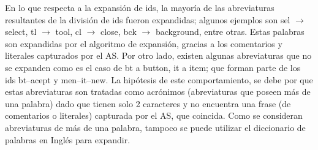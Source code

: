 En lo que respecta a la expansión de ids, la mayoría de las abreviaturas resultantes de la división de ids fueron expandidas; algunos ejemplos son \textsf{sel} $\rightarrow$ \textsf{select}, \textsf{tl} $\rightarrow$ \textsf{tool}, \textsf{cl} $\rightarrow$ \textsf{close}, \textsf{bck} $\rightarrow$ \textsf{background}, entre otras. Estas palabras son expandidas por el algoritmo de expansión, gracias a los comentarios y literales capturados por el AS.
Por otro lado, existen algunas abreviaturas que no se expanden como es el caso de \textsf{bt} a \textsf{button}, \textsf{it} a \textsf{item}; que forman parte de los ids \textsf{bt--acept} y \textsf{men--it--new}. La hipótesis de este comportamiento, se debe por que estas abreviaturas son tratadas como acrónimos (abreviaturas que poseen más de una palabra) dado que tienen solo 2 caracteres y no encuentra una frase (de comentarios o literales) capturada por el AS, que coincida. Como se consideran abreviaturas de más de una palabra, tampoco se puede utilizar el diccionario de palabras en Inglés para expandir.


